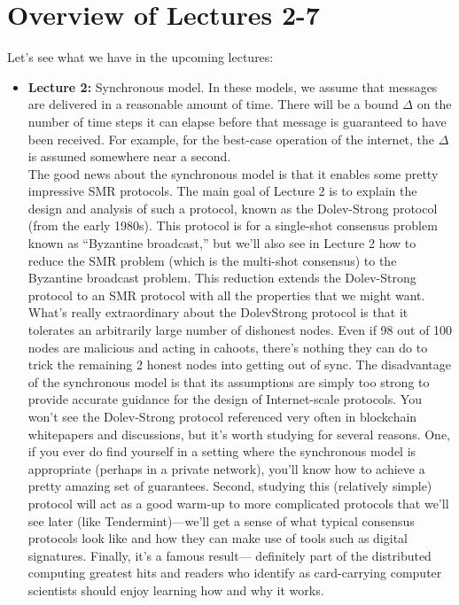 \chapter*{Overview of Lectures 2-7}
Let's see what we have in the upcoming lectures:\\

\begin{itemize}
    \item \textbf{Lecture 2: }Synchronous model. In these models, we assume that messages are delivered in a reasonable amount of time. There will be a bound $\Delta$ on the number of time steps it can elapse before that message is guaranteed to have been received. For example, for the best-case operation of the internet, the $\Delta$ is assumed somewhere near a second.\\
    The good news about the synchronous model is that it enables some pretty impressive
    SMR protocols. The main goal of Lecture 2 is to explain the design and analysis of such
    a protocol, known as the Dolev-Strong protocol (from the early 1980s). This protocol is
    for a single-shot consensus problem known as “Byzantine broadcast,” but we’ll also see in
    Lecture 2 how to reduce the SMR problem (which is the multi-shot consensus) to the Byzantine
    broadcast problem. This reduction extends the Dolev-Strong protocol to an SMR protocol
    with all the properties that we might want. What’s really extraordinary about the DolevStrong protocol is that it tolerates an arbitrarily large number of dishonest nodes. Even if
    98 out of 100 nodes are malicious and acting in cahoots, there’s nothing they can do to trick
    the remaining 2 honest nodes into getting out of sync. The disadvantage of the synchronous
    model is that its assumptions are simply too strong to provide accurate guidance for the
    design of Internet-scale protocols.
    You won’t see the Dolev-Strong protocol referenced very often in blockchain whitepapers
    and discussions, but it’s worth studying for several reasons. One, if you ever do find yourself
    in a setting where the synchronous model is appropriate (perhaps in a private network), you’ll
    know how to achieve a pretty amazing set of guarantees. Second, studying this (relatively
    simple) protocol will act as a good warm-up to more complicated protocols that we’ll see
    later (like Tendermint)—we’ll get a sense of what typical consensus protocols look like and
    how they can make use of tools such as digital signatures. Finally, it’s a famous result—
    definitely part of the distributed computing greatest hits and readers who identify as
    card-carrying computer scientists should enjoy learning how and why it works.


\end{itemize}
